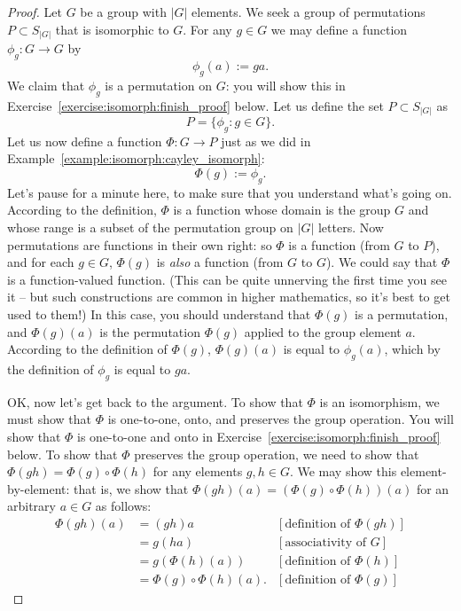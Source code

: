 \begin{proof}
Let $G$ be a group with $|G|$ elements.  We seek a group of permutations $P \subset S_{|G|}$ that is isomorphic to $G$.  For any $g \in G$ we may  define a  function $\phi_g : G \rightarrow G$ by 
\[
\phi_g(a) := ga.
\]
  We claim that $\phi_g$ is a permutation on $G$: you will show this in Exercise~\ref{exercise:isomorph:finish_proof} below.  Let us define the set $P\subset S_{|G|}$ as
\[
P = \{ \phi_g : g \in G \}.
\]
Let us now define a function $\Phi: G \rightarrow P$ just as we did in Example~\ref{example:isomorph:cayley_isomorph}:
\[ \Phi(g) := \phi_g. \]
Let's pause for a minute here, to make sure that you understand what's going on. According to the definition, $\Phi$ is a function whose domain is the group $G$ and whose range is a subset of the permutation group on $|G|$ letters. Now permutations are functions in their own right: so  $\Phi$ is a function (from $G$ to $P$), and for each $g \in G$, $\Phi(g)$ is \emph{also} a function (from $G$ to $G$). We could say that $\Phi$ is a function-valued function. (This can be quite unnerving the first time you see it -- but such constructions are common in higher mathematics, so it's best to get used to them!) In this case, you should understand that $\Phi(g)$ is a permutation, and $\Phi(g) (a)$ is the permutation $\Phi(g)$ applied to the group element $a$. According to the definition of $\Phi(g)$,  $\Phi(g) (a)$ is equal to $\phi_g(a)$, which by the definition of $\phi_g$ is equal to $ga$.

OK, now let's get back to the argument. To show that $\Phi$ is an isomorphism, we must show that $\Phi$ is one-to-one, onto, and preserves the group operation. 
You will show that $\Phi$ is one-to-one and onto in Exercise~\ref{exercise:isomorph:finish_proof} below. To show that $\Phi$ preserves the group operation, we need to show that $\Phi(gh) = \Phi(g) \circ \Phi(h)$ for any elements $g, h \in G$. We may show this element-by-element: that is, we show that $\Phi(gh)(a) = (\Phi(g) \circ \Phi(h))(a)$ for an arbitrary $a \in G$ as follows:
\begin{align*}
 \Phi(gh)(a) &= (gh)a & [\text{definition of } \Phi(gh)]\\
&= g(ha) & [\text{associativity of }G]\\
 &= g(\Phi(h)(a)) & [\text{definition of } \Phi(h)]\\
 &=\Phi(g) \circ \Phi(h)(a). & [\text{definition of } \Phi(g)]
 \end{align*}
\end{proof}
\medskip

